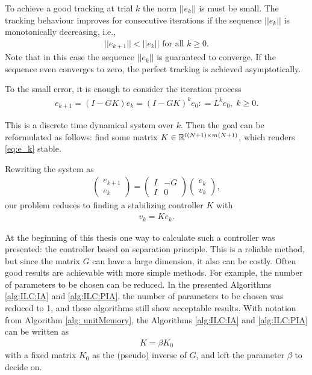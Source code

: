 To achieve a good tracking at trial $k$ the norm $||e_k||$ is must be small. 
The tracking behaviour improves for consecutive iterations if the sequence $||e_k||$ is monotonically decreasing, i.e., 
\begin{align}
\label{eq:ILC:monotonisity}
||e_{k+1} || < ||e_k|| \text{ for all } k \geq 0.
\end{align}
Note that in this case the sequence $||e_k||$ is guaranteed to converge. If the sequence even converges to zero, the perfect tracking is achieved asymptotically.

To the small error, it is enough to consider the iteration process 
\begin{align}
\label{eq:e_k}
e_{k+1} = (I - G K) e_k = (I - G K)^k e_0  : =  L^k e_{0}, \; k \geq 0.
\end{align}

This is a discrete time dynamical system over $k$. Then the goal can be reformulated as follows: find some matrix $K \in {\mathbb{R}}^{l(N+1) \times m (N+1)}$, which renders \eqref{eq:e_k} stable. %

Rewriting the system as
\begin{align}
\label{eq:ILC:e_kPlant}
\begin{pmatrix}
e_{k+1} \\ e_k
\end{pmatrix} = 
\left(
\begin{array}{c|c}
I & -G \\\hline I & 0
\end{array}\right) \begin{pmatrix}
e_k \\ v_k 
\end{pmatrix},
\end{align}
our problem reduces to finding a stabilizing controller $K$  with 
\begin{align}
v_k = K e_k.
\end{align} 

At the beginning of this thesis one way to calculate such a controller was presented: the controller based on separation principle. This is a reliable method, but since the matrix $G$ can have a 	large dimension, it also can be costly. Often good results are achievable with more simple methods. For example, the number of parameters to be chosen can be reduced. 
In the presented Algorithms \ref{alg:ILC:IA} and \ref{alg:ILC:PIA}, the number of parameters to be chosen was reduced to 1, and these algorithms still show acceptable results. With notation from Algorithm \ref{alg: unitMemory}, the Algorithms \ref{alg:ILC:IA} and  \ref{alg:ILC:PIA} can be written as 
\begin{align}
K = \beta K_0
\end{align}
with a fixed matrix $K_0$ as the (pseudo) inverse of $G$, and left the parameter $\beta$ to decide on. 



